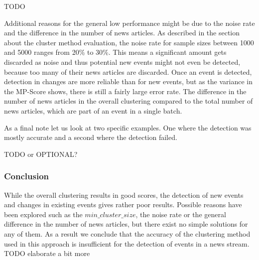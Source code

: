 TODO

Additional reasons for the general low performance might be due to the noise rate and the difference in the number of news articles. As described in the section about the cluster method evaluation, the noise rate for sample sizes between 1000 and 5000 ranges from 20\% to 30\%. This means a significant amount gets discarded as noise and thus potential new events might not even be detected, because too many of their news articles are discarded. Once an event is detected, detection in changes are more reliable than for new events, but as the variance in the MP-Score shows, there is still a fairly large error rate. The difference in the number of news articles in the overall clustering compared to the total number of news articles, which are part of an event in a single batch.      

As a final note let us look at two specific examples. One where the detection was mostly accurate and a second where the detection failed.

TODO or OPTIONAL? %

\subsubsection{Conclusion}

While the overall clustering results in good scores, the detection of new events and changes in existing events gives rather poor results. Possible reasons have been explored such as the $min\_cluster\_size$, the noise rate or the general difference in the number of news articles, but there exist no simple solutions for any of them. As a result we conclude that the accuracy of the clustering method used in this approach is insufficient for the detection of events in a news stream. TODO elaborate a bit more